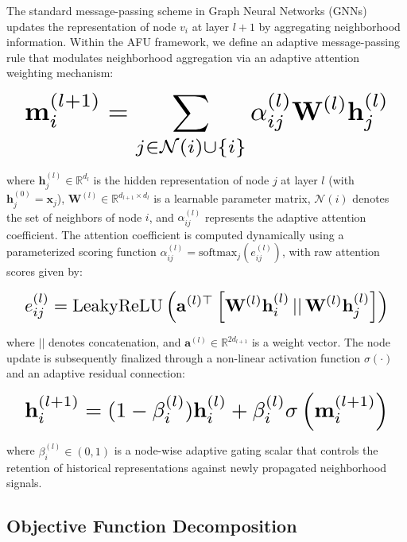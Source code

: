 \documentclass[10pt,twocolumn]{article}
\begin{document}
The standard message-passing scheme in Graph Neural Networks (GNNs) updates the representation of node $v_i$ at layer $l+1$ by aggregating neighborhood information. Within the \textsc{AFU} framework, we define an adaptive message-passing rule that modulates neighborhood aggregation via an adaptive attention weighting mechanism:

\begin{equation}
\resizebox{0.95\columnwidth}{!}{\ensuremath{\displaystyle \mathbf{m}_i^{(l+1)} = \sum_{j \in \mathcal{N}(i) \cup \{i\}} \alpha_{ij}^{(l)} \mathbf{W}^{(l)} \mathbf{h}_j^{(l)}}}
\end{equation}

\noindent where $\mathbf{h}_j^{(l)} \in \mathbb{R}^{d_l}$ is the hidden representation of node $j$ at layer $l$ (with $\mathbf{h}_j^{(0)} = \mathbf{x}_j$), $\mathbf{W}^{(l)} \in \mathbb{R}^{d_{l+1} \times d_l}$ is a learnable parameter matrix, $\mathcal{N}(i)$ denotes the set of neighbors of node $i$, and $\alpha_{ij}^{(l)}$ represents the adaptive attention coefficient. The attention coefficient is computed dynamically using a parameterized scoring function $\alpha_{ij}^{(l)} = \text{softmax}_j \left( e_{ij}^{(l)} \right)$, with raw attention scores given by:

\begin{equation}
\resizebox{0.95\columnwidth}{!}{\ensuremath{\displaystyle e_{ij}^{(l)} = \text{LeakyReLU}\left( \mathbf{a}^{(l)\top} \left[ \mathbf{W}^{(l)}\mathbf{h}_i^{(l)} \,||\, \mathbf{W}^{(l)}\mathbf{h}_j^{(l)} \right] \right)}}
\end{equation}

\noindent where $||$ denotes concatenation, and $\mathbf{a}^{(l)} \in \mathbb{R}^{2d_{l+1}}$ is a weight vector. The node update is subsequently finalized through a non-linear activation function $\sigma(\cdot)$ and an adaptive residual connection:

\begin{equation}
\resizebox{0.95\columnwidth}{!}{\ensuremath{\displaystyle \mathbf{h}_i^{(l+1)} = (1 - \beta_i^{(l)}) \mathbf{h}_i^{(l)} + \beta_i^{(l)} \sigma \left( \mathbf{m}_i^{(l+1)} \right)}}
\end{equation}

\noindent where $\beta_i^{(l)} \in (0, 1)$ is a node-wise adaptive gating scalar that controls the retention of historical representations against newly propagated neighborhood signals.

\subsection{Objective Function Decomposition}
\end{document}
